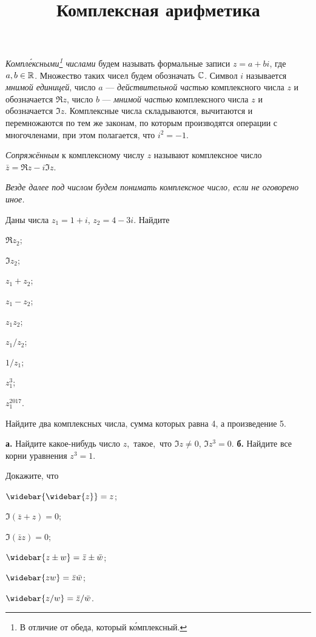 \documentclass[a4paper, 12pt, num=21]{listok}
\begin{document}
\title{Комплексная арифметика}
\maketitle{}
\begin{definition}
	\textit{Компл\'ексными\footnote{В отличие от обеда, который к\'омплексный.} числами} будем называть формальные записи $z = a + b i$, где $a, b \in \mathbb{R}$.
	Множество таких чисел будем обозначать $\mathbb{C}$.
	Символ $i$ называется \textit{мнимой единицей}, число $a$ --- \textit{действительной частью} комплексного числа $z$ и обозначается $\Re z$,
	число $b$ --- \textit{мнимой частью} комплексного числа $z$ и обозначается $\Im z$.
	Комплексные числа складываются, вычитаются и перемножаются по тем же законам, по которым производятся операции с
	многочленами, при этом полагается, что $i^2 = -1$.
\end{definition}
\begin{definition}
	\textit{Сопряжённым} к комплексному числу $z$ называют комплексное число $\bar{z} = \Re z - i \Im z$.
\end{definition}
\textit{Везде далее под числом будем понимать комплексное число, если не оговорено иное.}
\begin{problem}
Даны числа $z_1 = 1 + i$, $z_2 = 4 - 3i$.
Найдите
\begin{multienum}{5}
	\item $\Re z_2$;
	\item $\Im z_2$;
	\item $z_1 + z_2$;
	\item $z_1 - z_2$;
	\item $z_1z_2$;
	\item $z_1/z_2$;
	\item $1/z_1$;
	\item $z_1^3$;
	\item $z_1^{2017}$.
\end{multienum}
\end{problem}
\begin{problem}
	Найдите два комплексных числа, сумма которых равна 4, а произведение 5.
\end{problem}
\begin{problem}
	\textbf{а.} Найдите какое-нибудь число $z$,~такое,~что $\Im z \ne 0$, $\Im z^3 = 0$.
	\textbf{б.} Найдите все корни уравнения $z^3 = 1$.
\end{problem}
\begin{problem}
	Докажите, что
	\begin{multienum}{3}
		\item \( \widebar{\widebar{z}}  = z\);
		\item \( \Im(\bar z + z) = 0\);
		\item \( \Im(\bar zz) = 0\);
		\item \( \widebar{ z \pm w} = \bar z \pm \bar w\);
		\item \( \widebar{zw} = \bar z \bar w \);
		\item \( \widebar{z/w} = \bar z/ \bar w\).
	\end{multienum}
\end{problem}
\end{document}
